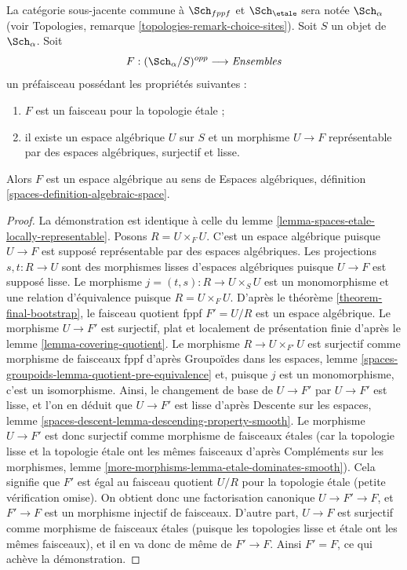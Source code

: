 \begin{lemma}
\label{lemma-spaces-smooth-locally-representable}
La catégorie sous-jacente commune à $\Sch_{fppf}$ et $\Sch_\etale$ sera notée
$\Sch_\alpha$
(voir Topologies, remarque \ref{topologies-remark-choice-sites}).
Soit $S$ un objet de $\Sch_\alpha$. Soit
$$
F : (\Sch_\alpha/S)^{opp} \longrightarrow \textit{Ensembles}
$$
un préfaisceau possédant les propriétés suivantes :
\begin{enumerate}
\item $F$ est un faisceau pour la topologie étale ;
\item il existe un espace algébrique $U$ sur $S$
et un morphisme $U \to F$ représentable par
des espaces algébriques, surjectif et lisse.
\end{enumerate}
Alors $F$ est un espace algébrique au sens de
Espaces algébriques, définition \ref{spaces-definition-algebraic-space}.
\end{lemma}

\begin{proof}
La démonstration est identique à celle du
lemme \ref{lemma-spaces-etale-locally-representable}.
Posons $R = U \times_F U$. C'est un espace algébrique puisque $U \to F$ est supposé
représentable par des espaces algébriques. Les projections $s, t : R \to U$ sont des
morphismes lisses d'espaces algébriques puisque $U \to F$ est supposé lisse.
Le morphisme $j = (t, s) : R \to U \times_S U$ est un monomorphisme et une
relation d'équivalence puisque $R = U \times_F U$. D'après le
théorème \ref{theorem-final-bootstrap},
le faisceau quotient fppf $F' = U/R$ est un espace algébrique.
Le morphisme $U \to F'$ est surjectif, plat et localement de présentation
finie d'après le lemme \ref{lemma-covering-quotient}.
Le morphisme $R \to U \times_{F'} U$ est surjectif comme morphisme de faisceaux
fppf d'après Groupoïdes dans les espaces, lemme
\ref{spaces-groupoids-lemma-quotient-pre-equivalence}
et, puisque $j$ est un monomorphisme, c'est un isomorphisme.
Ainsi, le changement de base de $U \to F'$ par $U \to F'$ est lisse,
et l'on en déduit que $U \to F'$ est lisse d'après
Descente sur les espaces, lemme \ref{spaces-descent-lemma-descending-property-smooth}.
Le morphisme $U \to F'$ est donc surjectif comme morphisme de faisceaux étales (car
la topologie lisse et la topologie étale ont les mêmes faisceaux d'après
Compléments sur les morphismes, lemme \ref{more-morphisms-lemma-etale-dominates-smooth}).
Cela signifie que $F'$ est égal au faisceau quotient $U/R$
pour la topologie étale (petite vérification omise). On obtient donc
une factorisation canonique $U \to F' \to F$, et $F' \to F$ est un morphisme
injectif de faisceaux. D'autre part, $U \to F$ est surjectif comme morphisme
de faisceaux étales (puisque les topologies lisse et étale ont les mêmes
faisceaux), et il en va donc de même de $F' \to F$. Ainsi $F' = F$,
ce qui achève la démonstration.
\end{proof}













